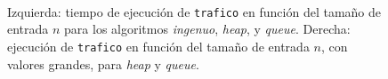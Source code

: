 \begin{figure}[!htbp]
    $\ \ \ \ $

    \caption{Izquierda: tiempo de ejecución de \texttt{trafico} en función del tamaño de entrada $n$ para los algoritmos \textit{ingenuo}, \textit{heap}, y \textit{queue}. Derecha: ejecución de \texttt{trafico} en función del tamaño de entrada $n$, con valores grandes, para \textit{heap} y \textit{queue}.}
    \label{grafico_2}
\end{figure}

